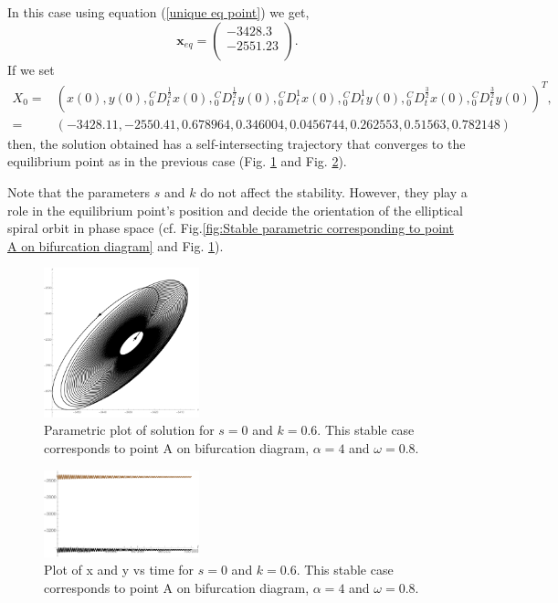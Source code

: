 \documentclass[pdflatex,sn-mathphys]{sn-jnl}%
\theoremstyle{thmstyleone}%
\theoremstyle{thmstyletwo}%
\theoremstyle{thmstylethree}%
\begin{document}
In this case using equation (\ref{unique eq point}) we get,
$$\mathbf{x}_{eq}=
\left(
\begin{array}{c}
 -3428.3 \\
 -2551.23 \\
\end{array}
\right).$$
If we set
\begin{align*}
X_{0}=&
\left(
x(0),
y(0),
{ }_{0}^{C}D_{t}^{\frac{1}{2}}x(0),
{ }_{0}^{C}D_{t}^{\frac{1}{2}}y(0),
{ }_{0}^{C}D_{t}^{1} x(0),
{ }_{0}^{C}D_{t}^{1}y(0),
{ }_{0}^{C}D_{t}^{\frac{3}{2}}x(0),
{ }_{0}^{C}D_{t}^{\frac{3}{2}}y(0)
\right)^T, \\ =& \left(
 -3428.11,
 -2550.41,
 0.678964,
 0.346004,
 0.0456744,
 0.262553,
 0.51563,
 0.782148 
\right) 
\end{align*}
then, the solution obtained has a self-intersecting trajectory that converges to the equilibrium point as in the previous case (Fig. \ref{fig:Stable parametric s,k,Stable case corresponding to point A on bifurcation diagram} and Fig. \ref{fig:Stale s,k,Stable case corresponding to point A on bifurcation diagram}). 

Note that the parameters $s$ and $k$ do not affect the stability. However, they play a role in the equilibrium point's position and decide the orientation of the elliptical spiral orbit in phase space (cf. Fig.\ref{fig:Stable parametric corresponding to point A on bifurcation diagram}  and Fig. \ref{fig:Stable parametric s,k,Stable case corresponding to point A on bifurcation diagram}).

\begin{figure}[h]%
\centering
\includegraphics[width=0.4\textwidth]{Fig2right(stable)Parametric}
    \caption{Parametric plot of solution for  $s=0$ and $ k=0.6$. This stable case corresponds to point A on bifurcation diagram, $\alpha = 4$ and  $\omega = 0.8$.}
    \label{fig:Stable parametric s,k,Stable case corresponding to point A on bifurcation diagram}
\end{figure}
\begin{figure}[h]%
\centering
\includegraphics[width=0.4\textwidth]{Fig2right(stable)Plot}
    \caption{Plot of x and y vs time for $s = 0$ and $k = 0.6$. This stable case corresponds to point A on bifurcation diagram, $\alpha = 4$ and  $\omega = 0.8$.}
    \label{fig:Stale s,k,Stable case corresponding to point A on bifurcation diagram}
\end{figure}
\end{document}
